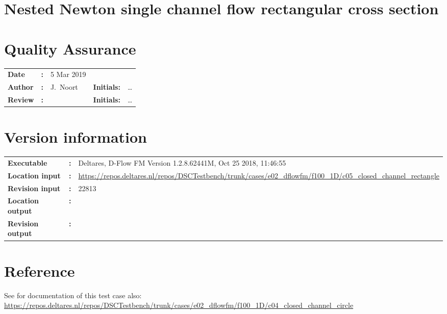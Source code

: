 

\section{Nested Newton single channel flow rectangular cross section}
\newrefsegment

\section*{Quality Assurance}
\begin{tabular}{@{}p{27mm}@{}p{0mm}p{\textwidth-52mm-48pt}p{15mm}p{10mm}}
\textbf{Date} & \textbf{:} &  5 Mar 2019  \\ 
\textbf{Author} & \textbf{:} &  J.\ Noort & \textbf{Initials:} & \ldots \\
\textbf{Review} & \textbf{:} &   & \textbf{Initials:} & \ldots 
\end{tabular}

\section*{Version information}
{{
\begin{tabular}{@{}p{27mm}@{}p{0mm}p{\textwidth-27mm-24pt}}
\textbf{Executable}   & \textbf{:} & Deltares, D-Flow FM Version 1.2.8.62441M, Oct 25 2018, 11:46:55 \\
\textbf{Location input}     & \textbf{:} & \url{https://repos.deltares.nl/repos/DSCTestbench/trunk/cases/e02_dflowfm/f100_1D/c05_closed_channel_rectangle} \\
\textbf{Revision input} & \textbf{:} & 22813 \\
\textbf{Location output}     & \textbf{:} & \\\textbf{Revision output} & \textbf{:} & 
\end{tabular}
}}


\section*{Reference}
See for documentation of this test case also: \url{https://repos.deltares.nl/repos/DSCTestbench/trunk/cases/e02_dflowfm/f100_1D/c04_closed_channel_circle}

\printrefsegment

